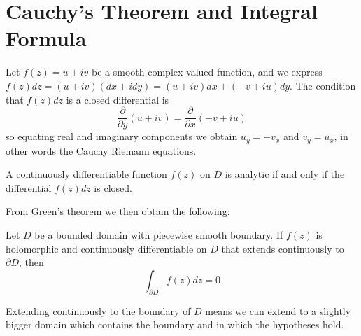 \documentclass[12pt, a4paper, oneside, openright, titlepage]{book}
\begin{document}
\section{Cauchy's Theorem and Integral Formula}


Let $f(z) = u+iv$ be a smooth complex valued function, and we express $f(z)dz = (u+iv)(dx+idy) = (u+iv)dx+(-v+iu)dy$. The condition that $f(z)dz$ is a closed differential is \begin{equation*}
    \frac{\partial}{\partial y}(u+iv) = \frac{\partial}{\partial x}(-v+iu)
\end{equation*}
so equating real and imaginary components we obtain $u_y = -v_x$ and $v_y = u_x$, in other words the Cauchy Riemann equations. 

\begin{thm}
    A continuously differentiable function $f(z)$ on $D$ is analytic if and only if the differential $f(z)dz$ is closed.
\end{thm}

From Green's theorem we then obtain the following:

\begin{namthm}
    Let $D$ be a bounded domain with piecewise smooth boundary. If $f(z)$ is holomorphic and continuously differentiable on $D$ that extends continuously to $\partial D$, then \begin{equation*}
        \int_{\partial D}f(z)dz = 0
    \end{equation*}
\end{namthm}

Extending continuously to the boundary of $D$ means we can extend to a slightly bigger domain which contains the boundary and in which the hypotheses hold.
\end{document}
